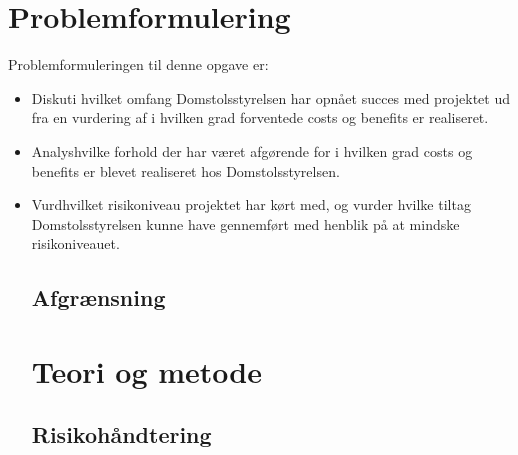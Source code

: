 \documentclass[10pt,a4paper,danish]{article}
\begin{document}
\section{Problemformulering}
Problemformuleringen til denne opgave er:
\begin{itemize}
\item Diskut i hvilket omfang Domstolsstyrelsen har opnået succes med projektet ud fra en vurdering af i hvilken grad forventede costs og benefits er realiseret.
\item Analys hvilke forhold der har været afgørende for i hvilken grad costs og benefits er blevet realiseret hos Domstolsstyrelsen.
\item Vurd hvilket risikoniveau projektet har kørt med, og vurder hvilke tiltag Domstolsstyrelsen kunne have gennemført med henblik på at mindske risikoniveauet.

\subsection{Afgrænsning}


\section{Teori og metode}




\subsection{Risikohåndtering}






\end{itemize}
\end{document}
